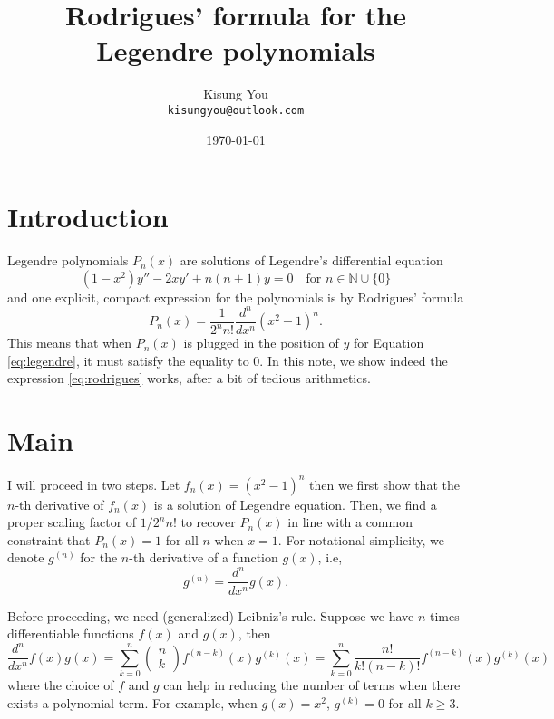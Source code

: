 \documentclass[fontsize=12pt]{article}
\title{Rodrigues' formula for the Legendre polynomials}
\author{
	Kisung You\\
	\texttt{kisungyou@outlook.com}
}
\date{\today}
\begin{document}
\maketitle

\section{Introduction}

Legendre polynomials $P_n (x)$ are solutions of Legendre's differential equation
\begin{equation}\label{eq:legendre}
(1-x^2) y'' - 2x y' + n(n+1) y = 0\quad\text{for  } n \in \mathbb{N}\cup \{0\}
\end{equation}
and one explicit, compact expression for the polynomials is by Rodrigues' formula
\begin{equation}\label{eq:rodrigues}
P_n (x) = \frac{1}{2^n n!} \frac{d^n}{dx^n} (x^2-1)^n.
\end{equation}
This means that when $P_n (x)$ is plugged in the position of $y$ for Equation \eqref{eq:legendre}, it must satisfy the equality to 0. In this note, we show indeed the expression \eqref{eq:rodrigues} works, after a bit of tedious arithmetics. 

\section{Main}
I will proceed in two steps. Let $f_n (x) = (x^2 - 1)^n$ then we first show that the $n$-th derivative of $f_n (x)$ is a solution of Legendre equation. Then, we find a proper scaling factor of $1/ 2^n n!$ to recover $P_n (x)$ in line with a common constraint that $P_n (x) = 1$ for all $n$ when $x=1$. For notational simplicity, we denote $g^{(n)}$ for the $n$-th derivative of a function $g(x)$, i.e,
\begin{equation*}
g^{(n)} = \frac{d^n}{dx^n} g(x).
\end{equation*}

Before proceeding, we need (generalized) Leibniz's rule. Suppose we have $n$-times differentiable functions $f(x)$ and $g(x)$, then 
\begin{equation}\label{eq:leibniz} 
\frac{d^n}{dx^n} f(x) g(x) = \sum_{k=0}^n
\begin{pmatrix}
n \\ k
\end{pmatrix}
f^{(n-k)} (x) g^{(k)} (x) = \sum_{k=0}^n \frac{n!}{k! (n-k)!} f^{(n-k)} (x) g^{(k)} (x) 
\end{equation}
where the choice of $f$ and $g$ can help in reducing the number of terms when there exists a polynomial term. For example, when $g(x) = x^2$, $g^{(k)} = 0$ for all $k \geq 3$. 
\end{document}
